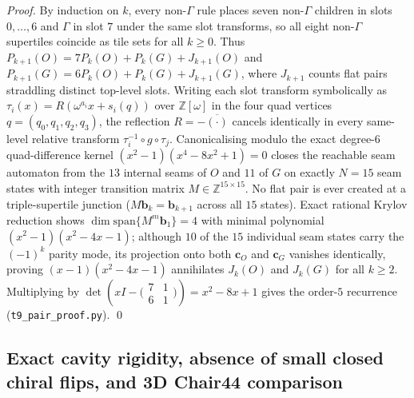 \emph{Proof.} By induction on $k$, every non-$\Gamma$ rule places seven non-$\Gamma$ children in slots $0,\dots,6$ and $\Gamma$ in slot $7$ under the same slot transforms, so all eight non-$\Gamma$ supertiles coincide as tile sets for all $k\ge0$. Thus $P_{k+1}(O)=7P_k(O)+P_k(G)+J_{k+1}(O)$ and $P_{k+1}(G)=6P_k(O)+P_k(G)+J_{k+1}(G)$, where $J_{k+1}$ counts flat pairs straddling distinct top-level slots. Writing each slot transform symbolically as $\tau_i(x)=R(\omega^{a_i}x+s_i(q))$ over $\mathbb{Z}[\omega]$ in the four quad vertices $q=(q_0,q_1,q_2,q_3)$, the reflection $R=-\overline{(\cdot)}$ cancels identically in every same-level relative transform $\tau_i^{-1}\circ g\circ\tau_j$. Canonicalising modulo the exact degree-$6$ quad-difference kernel $(x^2-1)(x^4-8x^2+1)=0$ closes the reachable seam automaton from the $13$ internal seams of $O$ and $11$ of $G$ on exactly $N=15$ seam states with integer transition matrix $M\in\mathbb{Z}^{15\times15}$. No flat pair is ever created at a triple-supertile junction ($M\mathbf{b}_k=\mathbf{b}_{k+1}$ across all $15$ states). Exact rational Krylov reduction shows $\dim\mathrm{span}\{M^m\mathbf{b}_1\}=4$ with minimal polynomial $(x^2-1)(x^2-4x-1)$; although $10$ of the $15$ individual seam states carry the $(-1)^k$ parity mode, its projection onto both $\mathbf{c}_O$ and $\mathbf{c}_G$ vanishes identically, proving $(x-1)(x^2-4x-1)$ annihilates $J_k(O)$ and $J_k(G)$ for all $k\ge2$. Multiplying by $\det\!\left(xI-\bigl(\begin{smallmatrix}7&1\\6&1\end{smallmatrix}\bigr)\right)=x^2-8x+1$ gives the order-$5$ recurrence (\texttt{t9\_pair\_proof.py}). \qed





\subsection{Exact cavity rigidity, absence of small closed chiral flips, and 3D Chair44 comparison}\label{sec:flips-sat}

